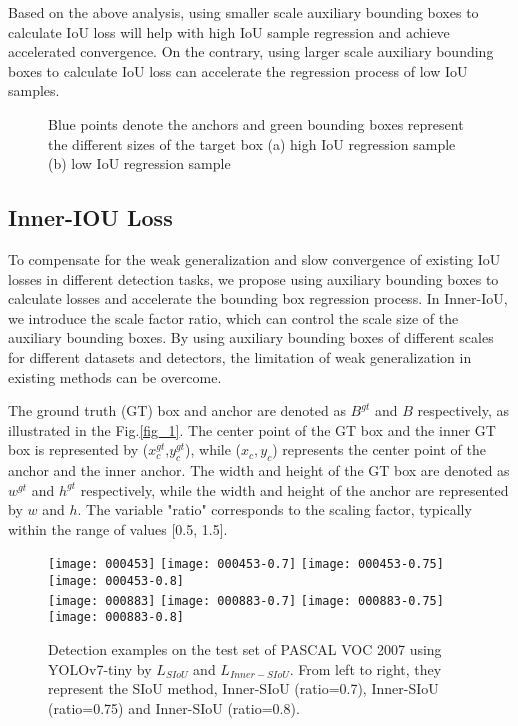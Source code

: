 \documentclass[lettersize,journal]{IEEEtran}
\begin{document}
	\par Based on the above analysis, using smaller scale auxiliary bounding boxes to calculate IoU loss will help with high IoU sample regression and achieve accelerated convergence. On the contrary, using larger scale auxiliary bounding boxes to calculate IoU loss can accelerate the regression process of low IoU samples.
	\begin{figure}[!htbp]
		\hfill
		\caption{Blue points denote the anchors and green bounding boxes represent the different sizes of the target box (a) high IoU regression sample (b) low IoU regression sample}
		\label{fig_6}
	\end{figure}
	\subsection{Inner-IOU Loss}
	To compensate for the weak generalization and slow convergence of existing IoU losses\cite{ref1,ref2,ref3,ref4,ref5} in different detection tasks, we propose using auxiliary bounding boxes to calculate losses and accelerate the bounding box regression process. In Inner-IoU, we introduce the scale factor ratio, which can control the scale size of the auxiliary bounding boxes. By using auxiliary bounding boxes of different scales for different datasets and detectors, the limitation of weak generalization in existing methods can be overcome. 
	\par The ground truth (GT) box and anchor are denoted as $B^{gt}$ and $B$ respectively, as illustrated in the Fig.\ref{fig_1}. The center point of the GT box and the inner GT box is represented by ($x_{c}^{gt}$,$y_{c}^{gt}$), while ($x_{c},y_{c}$) represents the center point of the anchor and the inner anchor. The width and height of the GT box are denoted as $w^{gt}$ and $h^{gt}$ respectively, while the width and height of the anchor are represented by $w$ and $h$. The variable "ratio" corresponds to the scaling factor, typically within the range of values [0.5, 1.5].
	\begin{figure*} [h]
		\centering
			\texttt{[image: 000453]}
		\hspace{0.1cm}
		\vspace{0.4cm}
			\texttt{[image: 000453-0.7]}
		\hspace{0.1cm}
			\texttt{[image: 000453-0.75]}
		\hspace{0.1cm}
			\texttt{[image: 000453-0.8]}
		\\
		\centering
			\texttt{[image: 000883]}
		\hspace{0.015cm}
			\texttt{[image: 000883-0.7]}
		\hspace{0.1cm}
			\texttt{[image: 000883-0.75]}
		\hspace{0.1cm}
			\texttt{[image: 000883-0.8]}
		\caption{Detection examples on the test set of PASCAL VOC 2007 using YOLOv7-tiny by  $L_{SIoU}$ and $L_{Inner-SIoU}$. From left to right, they represent the SIoU method, Inner-SIoU (ratio=0.7), Inner-SIoU (ratio=0.75) and Inner-SIoU (ratio=0.8). }
		\label{fig_5} 
	\end{figure*}
\end{document}
